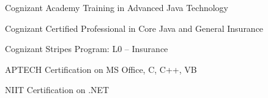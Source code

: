 

\begin{cvcerts}

  \cvcert
    {Cognizant Academy Training in Advanced Java Technology} %

  \cvcert
    {Cognizant Certified Professional in Core Java and General Insurance} %

  \cvcert
    {Cognizant Stripes Program: L0 – Insurance} %

  \cvcert
    {APTECH Certification on MS Office, C, C++, VB} %

  \cvcert
    {NIIT Certification on .NET} %

\end{cvcerts}
